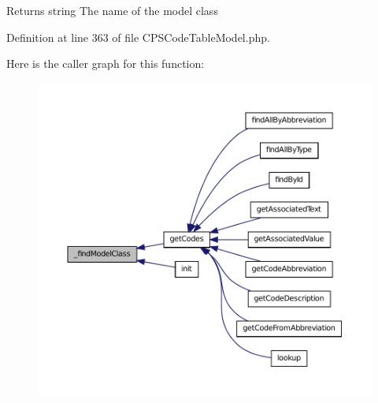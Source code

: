 \begin{DoxyReturn}{Returns}
string The name of the model class 
\end{DoxyReturn}


Definition at line 363 of file CPSCodeTableModel.php.








Here is the caller graph for this function:\nopagebreak
\begin{figure}[H]
\begin{center}
\leavevmode
\includegraphics[width=400pt]{classCPSCodeTableModel_a5f727a74cfab0f3c1a818055f2738779_icgraph}
\end{center}
\end{figure}


